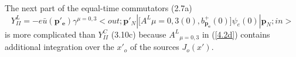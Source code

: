\documentclass[a4paper,10pt]{article}
\begin{document}
The next part of the equal-time commutators (2.7a)
\begin{equation}
\label{4.6}
Y^L_{II} = -e\bar{u}\left(\boldsymbol{p'_e}\right)\gamma^{\mu=0,3} < out; \boldsymbol{p}'_N |\Bigg[A^L\!{\mu=0,3}(0),b^+_{\boldsymbol{p_e}}(0)\Bigg]\psi_e(0)|\boldsymbol{p}_N;in>
\end{equation}
is more complicated than $Y^C_{II}$ (3.10c) because $A^L\!_{\mu=0,3}$ in (\ref{4.2d}) contains additional integration over the $x'_o$ of the sources $J_o(x')$.
\end{document}
